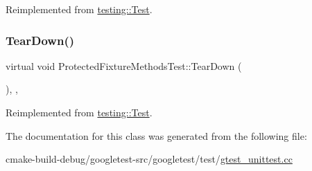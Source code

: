 Reimplemented from \mbox{\hyperlink{classtesting_1_1Test_a190315150c303ddf801313fd1a777733}{testing\+::\+Test}}.

\mbox{\label{classProtectedFixtureMethodsTest_aa143dff0a99903cde207b6fd0042c03c}} 
\subsubsection{\texorpdfstring{TearDown()}{TearDown()}}
{\footnotesize\ttfamily virtual void Protected\+Fixture\+Methods\+Test\+::\+Tear\+Down (\begin{DoxyParamCaption}{ }\end{DoxyParamCaption})\hspace{0.3cm}{\ttfamily [inline]}, {\ttfamily [protected]}, {\ttfamily [virtual]}}



Reimplemented from \mbox{\hyperlink{classtesting_1_1Test_a5f0ab439802cbe0ef7552f1a9f791923}{testing\+::\+Test}}.



The documentation for this class was generated from the following file\+:\begin{DoxyCompactItemize}
\item 
cmake-\/build-\/debug/googletest-\/src/googletest/test/\mbox{\hyperlink{gtest__unittest_8cc}{gtest\+\_\+unittest.\+cc}}\end{DoxyCompactItemize}
